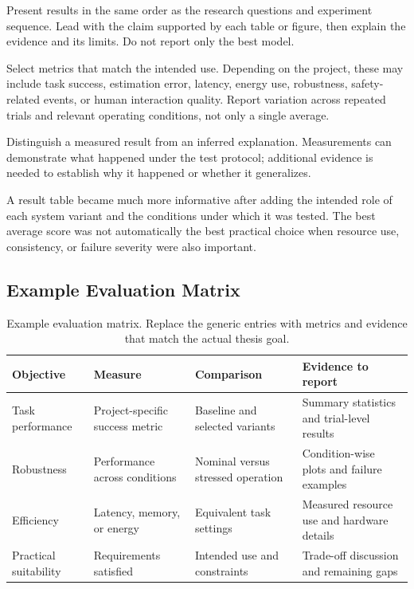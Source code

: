 \documentclass[a4paper,11pt,oneside]{article}
\begin{document}
  \begin{guidance}
  Present results in the same order as the research questions and experiment
  sequence. Lead with the claim supported by each table or figure, then explain
  the evidence and its limits. Do not report only the best model.

  Select metrics that match the intended use. Depending on the project, these
  may include task success, estimation error, latency, energy use, robustness,
  safety-related events, or human interaction quality. Report variation across
  repeated trials and relevant operating conditions, not only a single average.

  Distinguish a measured result from an inferred explanation. Measurements can
  demonstrate what happened under the test protocol; additional evidence is
  needed to establish why it happened or whether it generalizes.
  \end{guidance}

  \begin{experiencenote}
  A result table became much more informative after adding the intended role of
  each system variant and the conditions under which it was tested. The best
  average score was not automatically the best practical choice when resource
  use, consistency, or failure severity were also important.
  \end{experiencenote}

  \subsection{Example Evaluation Matrix}

  \begin{table}[ht]
    \centering
    \small
    \begin{tabularx}{\textwidth}{YYYY}
      \toprule
      Objective & Measure & Comparison & Evidence to report \\
      \midrule
      Task performance & Project-specific success metric & Baseline and selected variants & Summary statistics and trial-level results \\
      Robustness & Performance across conditions & Nominal versus stressed operation & Condition-wise plots and failure examples \\
      Efficiency & Latency, memory, or energy & Equivalent task settings & Measured resource use and hardware details \\
      Practical suitability & Requirements satisfied & Intended use and constraints & Trade-off discussion and remaining gaps \\
      \bottomrule
    \end{tabularx}
    \caption{Example evaluation matrix. Replace the generic entries with metrics
      and evidence that match the actual thesis goal.}
  \end{table}
\end{document}
